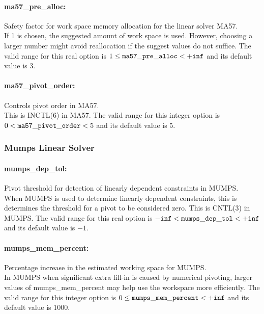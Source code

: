 \paragraph{ma57\_pre\_alloc:}\label{sec:ma57_pre_alloc} Safety factor for work space memory allocation for the linear solver MA57. $\;$ \\
 If 1 is chosen, the suggested amount of work
space is used.  However, choosing a larger number
might avoid reallocation if the suggest values do
not suffice.  The valid range for this real option is 
$1 \le {\tt ma57\_pre\_alloc } <  {\tt +inf}$
and its default value is $3$.


\paragraph{ma57\_pivot\_order:}\label{sec:ma57_pivot_order} Controls pivot order in MA57. $\;$ \\
This is INCTL(6) in MA57.
The valid range for this integer option is 
$0 <  {\tt ma57\_pivot\_order } <  5$
and its default value is $5$.

\subsubsection{Mumps Linear Solver}
\label{sec:Mumps_Linear_Solver}

\paragraph{mumps\_dep\_tol:}\label{sec:mumps_dep_tol} Pivot threshold for detection of linearly dependent constraints in MUMPS. $\;$ \\
 When MUMPS is used to determine linearly
dependent constraints, this is determines the
threshold for a pivot to be considered zero. 
This is CNTL(3) in MUMPS. The valid range for this real option is 
${\tt -inf} <  {\tt mumps\_dep\_tol } <  {\tt +inf}$
and its default value is $-1$.


\paragraph{mumps\_mem\_percent:}\label{sec:mumps_mem_percent} Percentage increase in the estimated working space for MUMPS. $\;$ \\
 In MUMPS when significant extra fill-in is caused
by numerical pivoting, larger values of
mumps\_mem\_percent may help use the workspace
more efficiently. The valid range for this integer option is
$0 \le {\tt mumps\_mem\_percent } <  {\tt +inf}$
and its default value is $1000$.


